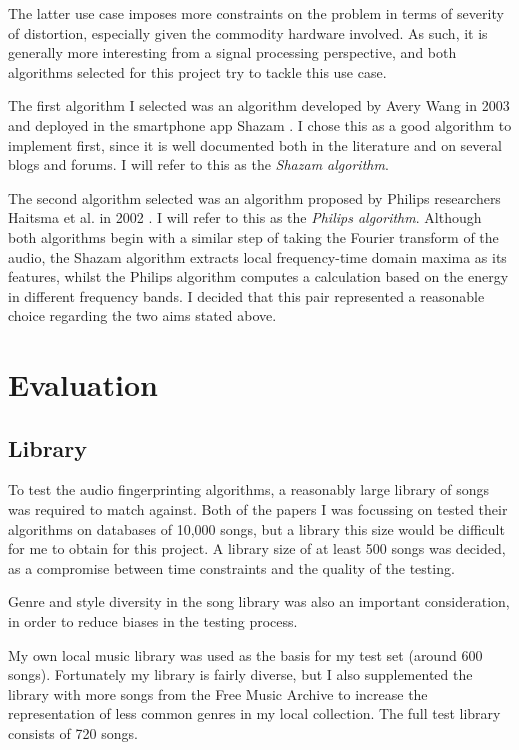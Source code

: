 \documentclass[12pt,a4paper,twoside,openright]{report}
\begin{document}
The latter use case imposes more constraints on the problem in terms of severity of distortion, especially given the commodity hardware involved. As such, it is generally more interesting from a signal processing perspective, and both algorithms selected for this project try to tackle this use case.

The first algorithm I selected was an algorithm developed by Avery Wang in 2003 and deployed in the smartphone app Shazam \cite{Wang03}. I chose this as a good algorithm to implement first, since it is well documented both in the literature and on several blogs and forums. I will refer to this as the \textit{Shazam algorithm}.

The second algorithm selected was an algorithm proposed by Philips researchers Haitsma et al. in 2002 \cite{Haitsma02}. I will refer to this as the \textit{Philips algorithm}. Although both algorithms begin with a similar step of taking the Fourier transform of the audio, the Shazam algorithm extracts local frequency-time domain maxima as its features, whilst the Philips algorithm computes a calculation based on the energy in different frequency bands. I decided that this pair represented a reasonable choice regarding the two aims stated above.


\section{Evaluation}

\subsection{Library}

To test the audio fingerprinting algorithms, a reasonably large library of songs was required to match against. Both of the papers I was focussing on tested their algorithms on databases of 10,000 songs, but a library this size would be difficult for me to obtain for this project. A library size of at least 500 songs was decided, as a compromise between time constraints and the quality of the testing.

Genre and style diversity in the song library was also an important consideration, in order to reduce biases in the testing process.

My own local music library was used as the basis for my test set (around 600 songs). Fortunately my library is fairly diverse, but I also supplemented the library with more songs from the Free Music Archive to increase the representation of less common genres in my local collection. The full test library consists of 720 songs.
\end{document}
